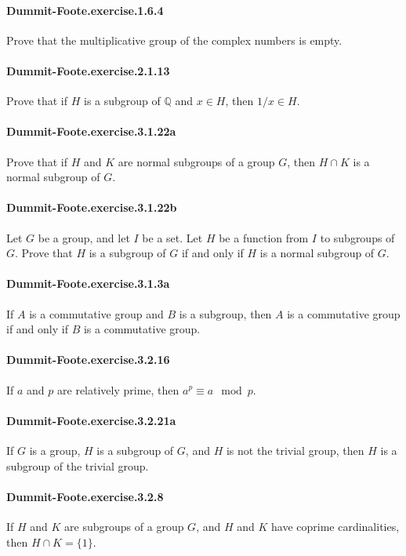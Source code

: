\documentclass{article}
\begin{document}
\paragraph{Dummit-Foote.exercise.1.6.4} Prove that the multiplicative group of the complex numbers is empty.

\paragraph{Dummit-Foote.exercise.2.1.13} Prove that if $H$ is a subgroup of $\mathbb{Q}$ and $x \in H$, then $1/x \in H$.

\paragraph{Dummit-Foote.exercise.3.1.22a} Prove that if $H$ and $K$ are normal subgroups of a group $G$, then $H \cap K$ is a normal subgroup of $G$.

\paragraph{Dummit-Foote.exercise.3.1.22b} Let $G$ be a group, and let $I$ be a set. Let $H$ be a function from $I$ to subgroups of $G$. Prove that $H$ is a subgroup of $G$ if and only if $H$ is a normal subgroup of $G$.

\paragraph{Dummit-Foote.exercise.3.1.3a} If $A$ is a commutative group and $B$ is a subgroup, then $A$ is a commutative group if and only if $B$ is a commutative group.

\paragraph{Dummit-Foote.exercise.3.2.16} If $a$ and $p$ are relatively prime, then $a^p \equiv a \mod p$.

\paragraph{Dummit-Foote.exercise.3.2.21a} If $G$ is a group, $H$ is a subgroup of $G$, and $H$ is not the trivial group, then $H$ is a subgroup of the trivial group.

\paragraph{Dummit-Foote.exercise.3.2.8} If $H$ and $K$ are subgroups of a group $G$, and $H$ and $K$ have coprime cardinalities, then $H \cap K = \{1\}$.
\end{document}
